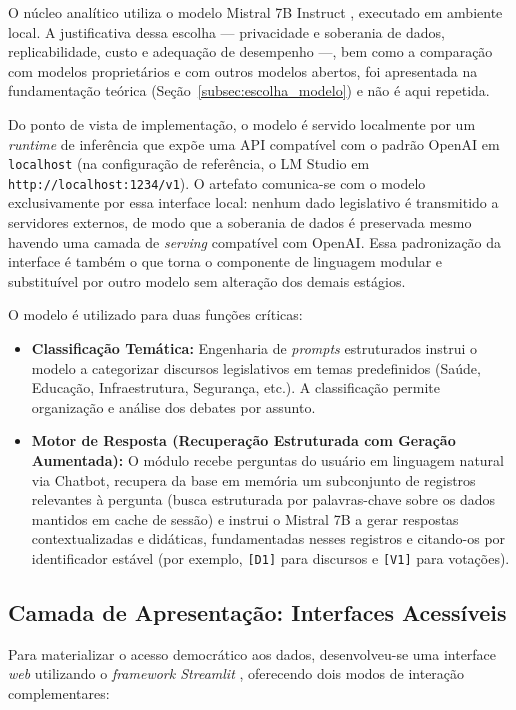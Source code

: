 O núcleo analítico utiliza o modelo Mistral 7B Instruct \cite{MistralAI2024}, executado em ambiente local. A justificativa dessa escolha --- privacidade e soberania de dados, replicabilidade, custo e adequação de desempenho ---, bem como a comparação com modelos proprietários e com outros modelos abertos, foi apresentada na fundamentação teórica (Seção~\ref{subsec:escolha_modelo}) e não é aqui repetida.

Do ponto de vista de implementação, o modelo é servido localmente por um \textit{runtime} de inferência que expõe uma API compatível com o padrão OpenAI em \texttt{localhost} (na configuração de referência, o LM Studio em \texttt{http://localhost:1234/v1}). O artefato comunica-se com o modelo exclusivamente por essa interface local: nenhum dado legislativo é transmitido a servidores externos, de modo que a soberania de dados é preservada mesmo havendo uma camada de \textit{serving} compatível com OpenAI. Essa padronização da interface é também o que torna o componente de linguagem modular e substituível por outro modelo sem alteração dos demais estágios.

O modelo é utilizado para duas funções críticas:

\begin{itemize}
    \item \textbf{Classificação Temática:} Engenharia de \textit{prompts} estruturados instrui o modelo a categorizar discursos legislativos em temas predefinidos (Saúde, Educação, Infraestrutura, Segurança, etc.). A classificação permite organização e análise dos debates por assunto.

    \item \textbf{Motor de Resposta (Recuperação Estruturada com Geração Aumentada):} O módulo recebe perguntas do usuário em linguagem natural via Chatbot, recupera da base em memória um subconjunto de registros relevantes à pergunta (busca estruturada por palavras-chave sobre os dados mantidos em cache de sessão) e instrui o Mistral 7B a gerar respostas contextualizadas e didáticas, fundamentadas nesses registros e citando-os por identificador estável (por exemplo, \texttt{[D1]} para discursos e \texttt{[V1]} para votações).
\end{itemize}

\subsection{Camada de Apresentação: Interfaces Acessíveis}

Para materializar o acesso democrático aos dados, desenvolveu-se uma interface \textit{web} utilizando o \textit{framework Streamlit} \cite{Streamlit2024}, oferecendo dois modos de interação complementares:

